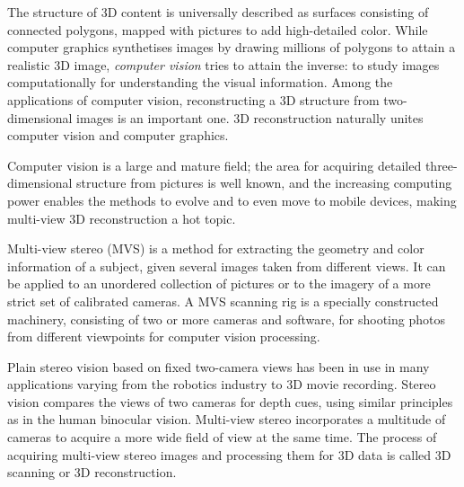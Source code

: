 
The structure of 3D content is universally described as surfaces consisting of connected polygons, mapped with pictures to add high-detailed color.
While computer graphics synthetises images by drawing millions of polygons to attain a realistic 3D image, \emph{computer vision} tries to attain the inverse:
to study images computationally for understanding the visual information.
Among the applications of computer vision, reconstructing a 3D structure from two-dimensional images is an important one.
3D reconstruction naturally unites computer vision and computer graphics.


Computer vision is a large and mature field; the area for acquiring detailed three-dimensional structure from pictures is well known, and the increasing computing power enables the methods to evolve and to even move to mobile devices, making multi-view 3D reconstruction a hot topic.

Multi-view stereo (MVS) is a method for extracting the geometry and color information of a subject, given several images taken from different views.
It can be applied to an unordered collection of pictures or to the imagery of a more strict set of calibrated cameras.
A MVS scanning rig is a specially constructed machinery, consisting of two or more cameras and software, for shooting photos from different viewpoints for computer vision processing.

Plain stereo vision based on fixed two-camera views has been in use in many applications varying from the robotics industry to 3D movie recording.
Stereo vision compares the views of two cameras for depth cues, using similar principles as in the human binocular vision.
Multi-view stereo incorporates a multitude of cameras to acquire a more wide field of view at the same time.
The process of acquiring multi-view stereo images and processing them for 3D data is called 3D scanning or 3D reconstruction.


